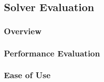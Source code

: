 \subsection{Solver Evaluation}

\subsubsection{Overview}

\subsubsection{Performance Evaluation}

\subsubsection{Ease of Use}
